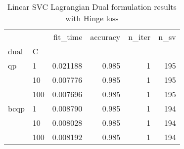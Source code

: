 \begin{table}[H]
\centering
\caption{Linear SVC Lagrangian Dual formulation results with Hinge loss}
\label{linear_lagrangian_dual_svc_cv_results}
\begin{tabular}{llrrrr}
\toprule
     &     &  fit\_time &  accuracy &  n\_iter &  n\_sv \\
dual & C &           &           &         &       \\
\midrule
qp & 1   &  0.021188 &     0.985 &       1 &   195 \\
     & 10  &  0.007776 &     0.985 &       1 &   195 \\
     & 100 &  0.007696 &     0.985 &       1 &   195 \\
bcqp & 1   &  0.008790 &     0.985 &       1 &   194 \\
     & 10  &  0.008028 &     0.985 &       1 &   194 \\
     & 100 &  0.008192 &     0.985 &       1 &   194 \\
\bottomrule
\end{tabular}
\end{table}
